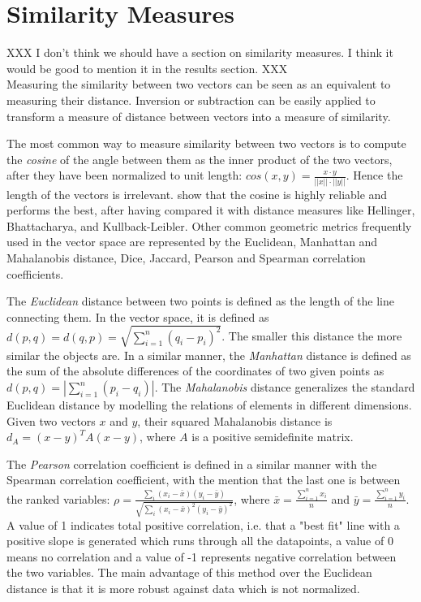 \documentclass[11pt]{article}
\begin{document}
\section{Similarity Measures}
XXX I don't think we should have a section on similarity measures. I think it would be good to mention it in the results section. XXX\\
Measuring the similarity between two vectors can be seen as an equivalent to measuring their distance. Inversion or subtraction can be easily applied to transform a measure of distance between vectors into a measure of similarity. 

The most common way to measure similarity between two vectors is to compute the \textit{cosine} of the angle between them as the inner product of the two vectors, after they have been normalized to unit length: $cos(x,y) = \frac{x \cdot y}{||x||\cdot||y||}$. Hence the length of the vectors is irrelevant. \cite{Bullinaria:97} show that the cosine is highly reliable and performs the best, after having compared it with distance measures like Hellinger, Bhattacharya, and Kullback-Leibler. Other common geometric metrics frequently used in the vector space are represented by the Euclidean, Manhattan and Mahalanobis distance, Dice, Jaccard, Pearson and Spearman correlation coefficients.

The \textit{Euclidean} distance between two points is defined as the length of the line connecting them. In the vector space, it is defined as $d(p,q) = d(q,p) = \sqrt{\sum_{i=1}^{n}(q_i-p_i)^2} $. The smaller this distance the more similar the objects are.  In a similar manner, the \textit{Manhattan} distance is defined as the sum of the absolute differences of the coordinates of two given points as $d(p,q) = |\sum_{i=1}^{n}(p_i - q_i)|$. The \textit{Mahalanobis} distance generalizes the standard Euclidean distance by modelling the relations of elements in different dimensions. Given two vectors $x$ and $y$, their squared Mahalanobis distance is $d_A = (x-y)^T A (x-y)$, where $A$ is a positive semidefinite matrix.

The \textit{Pearson} correlation coefficient is defined in a similar manner with the Spearman correlation coefficient, with the mention that the last one is between the ranked variables: $\rho=\frac{\sum_i(x_i - \bar{x})(y_i - \bar{y})}{\sqrt{\sum_i(x_i - \bar{x})^2 (y_i - \bar{y})^2 }}$, where $\bar{x} = \frac{\sum_{i=1}^{n}x_i}{n}$ and $\bar{y} = \frac{\sum_{i=1}^{n}y_i}{n}$. A value of 1 indicates total positive correlation, i.e. that a "best fit" line with a positive slope is generated which runs through all the datapoints, a value of 0 means no correlation and a value of -1 represents negative correlation between the two variables. The main advantage of this method over the Euclidean distance is that it is more robust against data which is not normalized.
\end{document}
